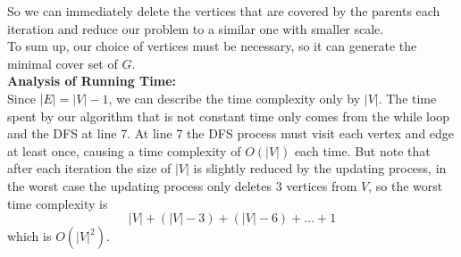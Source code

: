 \documentclass[12pt,letterpaper]{article}
\begin{document}
So we can immediately delete the vertices that are covered by the parents each iteration
and reduce our problem to a similar one with smaller scale.\\
To sum up, our choice of vertices must be necessary,
so it can generate the minimal cover set of $G$.\\
\textbf{Analysis of Running Time:}\\
Since $|E|=|V|-1$, we can describe the time complexity only by $|V|$.
The time spent by our algorithm that is not constant time only comes from the while loop and the DFS at line 7.
At line 7 the DFS process must visit each vertex and edge at least once,
causing a time complexity of $O(|V|)$ each time.
But note that after each iteration the size of $|V|$ is slightly reduced by the updating process,
in the worst case the updating process only deletes 3 vertices from $V$,
so the worst time complexity is 
$$|V|+(|V|-3)+(|V|-6)+\dots+1$$
which is $O(|V|^2)$.
\end{document}
